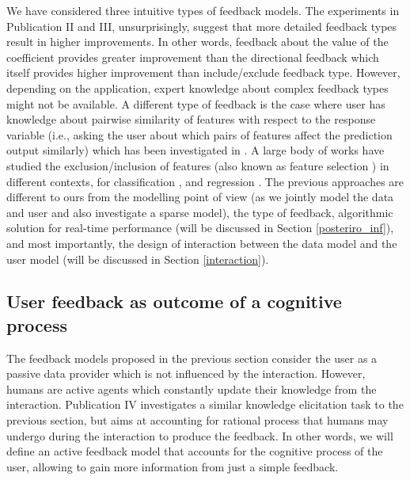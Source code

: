 \documentclass[dissertation,math,vertlayout,pdfa,colorlinks]{aaltoseries}
\begin{document}
We have considered three intuitive types of feedback models. The experiments in Publication II and III, unsurprisingly, suggest that more detailed feedback types result in higher improvements. In other words, feedback about the value of the coefficient provides greater improvement than the directional feedback which itself provides higher improvement than include/exclude feedback type. However, depending on the application, expert knowledge about complex feedback types might not be available. %
A different type of feedback is the case where user has knowledge about pairwise similarity of features with respect to the response variable (i.e., asking the user about which  pairs of features affect the prediction output similarly) which has been investigated in \cite{Homayun_pairwise_UMAP,Homayun_pairwise_ijcai2019}. A large body of works have studied the exclusion/inclusion of features (also known as feature selection \cite{Correia2019HumanintheLoopFS}) in different contexts, for classification  \cite{druck2009active,raghavan2006active,settles2011closing}, and regression \cite{Micallef_elicitation}. %
The previous approaches are different to ours from the modelling point of view (as we jointly model the data and user and also investigate a sparse model), the type of feedback, algorithmic solution for real-time performance (will be discussed in Section \ref{posteriro_inf}), and most importantly, the design of interaction between the data model and the user model (will be discussed in Section \ref{interaction}).

\subsection{User feedback as outcome of a cognitive process}

The feedback models proposed in the previous section consider the user as a passive data provider which is not influenced by the interaction. However, humans are active agents which constantly update their knowledge from the interaction. Publication IV investigates a similar knowledge elicitation task to the previous section, but aims at accounting for rational process that humans may undergo during the interaction to produce the feedback. In other words, we will define an active feedback model that accounts for the cognitive process of the user, allowing to gain more information from just a simple feedback.
\end{document}
